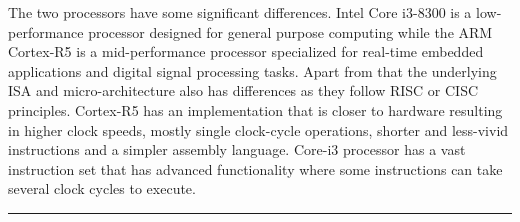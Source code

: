 \documentclass[a4paper,11pt]{article}
\begin{document}
The two processors have some significant differences. Intel Core i3-8300 is a low-performance processor designed for general purpose computing while the ARM Cortex-R5 is a mid-performance processor specialized for real-time embedded applications and digital signal processing tasks. Apart from that the underlying ISA and micro-architecture also has differences as they follow RISC or CISC principles. Cortex-R5 has an implementation that is closer to hardware resulting in higher clock speeds, mostly single clock-cycle operations, shorter and less-vivid instructions and a simpler assembly language. Core-i3 processor has a vast instruction set that has advanced functionality where some instructions can take several clock cycles to execute.



%
%


\vspace{1cm}\hrule

\scriptsize

%
\end{document}
